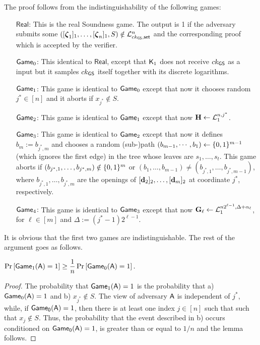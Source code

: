 The proof follows from the indistinguishability of the following games:
\begin{itemize}
\item[\(\mathsf{Real}\):] This is the real Soundness game. The output is 1 if the adversary submits some \(([{\boldsymbol \zeta}_1]_1,\ldots,[{\boldsymbol \zeta}_n]_1,S)\notin\mathcal{L}_{ck_{\mathsf{GS}},\mathsf{set}}^n\) and the corresponding proof which is accepted by the verifier.
\item[\(\mathsf{Game}_0\):] This identical to \(\mathsf{Real}\), except that \(\mathsf{K}_1\) does not receive \(ck_{\mathsf{GS}}\) as a input but
it samples \(ck_{\mathsf{GS}}\) itself together with its discrete logarithms.
\item[\(\mathsf{Game}_1\):] This game is identical to \(\mathsf{Game}_0\) except that now it chooses random \(j^*\in[n]\) and it aborts if \(x_{j^*}\notin S\).
\item[\(\mathsf{Game}_2\):] This game is identical to \(\mathsf{Game}_1\) except that now \(\mathbf{{H}}\gets\mathcal{L}^{n,j^*}_1\).
\item[\(\mathsf{Game}_3\):] This game is identical to \(\mathsf{Game}_2\) except that now it defines $b_m:=b_{j^*,m}$ and chooses a random (sub-)path $(b_{m-1},\cdots, b_1)\gets\{0,1\}^{m-1}$ (which ignores the first edge) in the tree whose leaves are $s_1,\ldots,s_t$. This game aborts if \((b_{j^*,1},\ldots,b_{j^*,m})\notin\{0,1\}^m\) or \((b_1,\ldots, b_{m-1})\neq(b_{j^*,1},\ldots, b_{j^*,m-1})\), where \(b_{j^*,1},\ldots,b_{j^*,m}\) are the openings of \([\mathbf{d}_2]_2,\ldots,[\mathbf{d}_m]_2\) at coordinate \(j^*\), respectively.
\item[\(\mathsf{Game}_4\):] This game is identical to \(\mathsf{Game}_3\) except that now \(\mathbf{{G}}_\ell\gets\mathcal{L}_1^{n2^{\ell-1},\Delta+\alpha_\ell}\), for \(\ell\in [m]\) and $\Delta:=(j^*-1)2^{\ell-1}$.
\end{itemize}

It is obvious that the first two games are indistinguishable. The rest of the argument goes as follows.

\begin{lemma}
\(\Pr\left[ \mathsf{Game}_1(\mathsf{A})=1\right]\geq\dfrac{1}{n}\Pr\left[\mathsf{Game}_0(\mathsf{A})=1\right].\)
\end{lemma}

\begin{proof}  The probability that
 \(\mathsf{Game}_1(\mathsf{A})=1\) is the probability that  a) \(\mathsf{Game}_0(\mathsf{A})=1\) and
b)  \(x_{j^*} \notin S\). The view of adversary \(\mathsf{A}\) is independent of \(j^*\), while, if \(\mathsf{Game_0}(\mathsf{A})=1\), then there is at least one index \(j \in [n]\) such that  
such that  \(x_{j} \notin S\). Thus, 
the probability that the event described in b) occurs conditioned on \(\mathsf{Game_0}(\mathsf{A})=1\), is greater than or equal to \(1/n\) and the lemma follows.
\end{proof}

